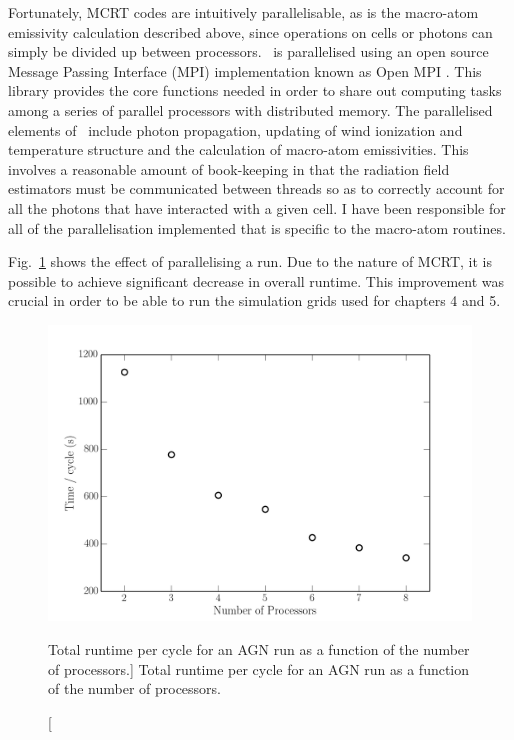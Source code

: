 Fortunately, MCRT codes are intuitively parallelisable, as is the macro-atom
emissivity calculation described above, since operations on cells or photons can
simply be divided up between processors. \py\ is parallelised using an open 
source Message Passing Interface (MPI) implementation known as 
Open MPI \citep{openmpi}. This library provides the core functions needed
in order to share out computing tasks among a series of parallel processors
with distributed memory. The parallelised elements of \py\ include
photon propagation, updating of wind ionization and temperature structure
and the calculation of macro-atom emissivities. This involves
a reasonable amount of book-keeping in that the radiation field estimators 
must be communicated between threads so as to correctly account for all
the photons that have interacted with a given cell. I have been responsible
for all of the parallelisation implemented that is
specific to the macro-atom routines.

Fig.~\ref{fig:para_times} shows the effect of parallelising a run. Due to the nature of MCRT,
it is possible to achieve significant decrease in overall 
runtime. This improvement was crucial in order to be able to run the simulation
grids used for chapters 4 and 5.


\begin{figure}
\centering
\includegraphics[width=1.0\textwidth]{figures/03-radtrans/para_times.png}
\caption
[Total runtime per cycle for an AGN run as a 
function of the number of processors.]
{
Total runtime per cycle for an AGN run as a 
function of the number of processors.
} 
\label{fig:para_times}
\end{figure}


